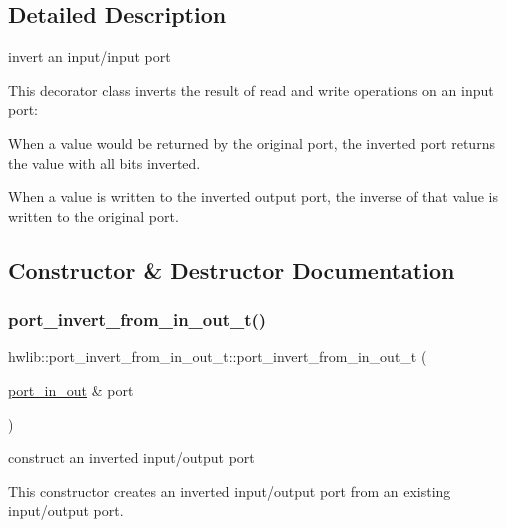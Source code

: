 \subsection{Detailed Description}
invert an input/input port

This decorator class inverts the result of read and write operations on an input port\+:
\begin{DoxyItemize}
\item When a value would be returned by the original port, the inverted port returns the value with all bits inverted.
\item When a value is written to the inverted output port, the inverse of that value is written to the original port. 
\end{DoxyItemize}

\subsection{Constructor \& Destructor Documentation}
\mbox{\label{classhwlib_1_1port__invert__from__in__out__t_a7723fe971e2ade703dfefa4407fd0a7e}} 
\subsubsection{\texorpdfstring{port\+\_\+invert\+\_\+from\+\_\+in\+\_\+out\+\_\+t()}{port\_invert\_from\_in\_out\_t()}}
{\footnotesize\ttfamily hwlib\+::port\+\_\+invert\+\_\+from\+\_\+in\+\_\+out\+\_\+t\+::port\+\_\+invert\+\_\+from\+\_\+in\+\_\+out\+\_\+t (\begin{DoxyParamCaption}\item[{\hyperlink{classhwlib_1_1port__in__out}{port\+\_\+in\+\_\+out} \&}]{port }\end{DoxyParamCaption})\hspace{0.3cm}{\ttfamily [inline]}}

construct an inverted input/output port

This constructor creates an inverted input/output port from an existing input/output port. 

